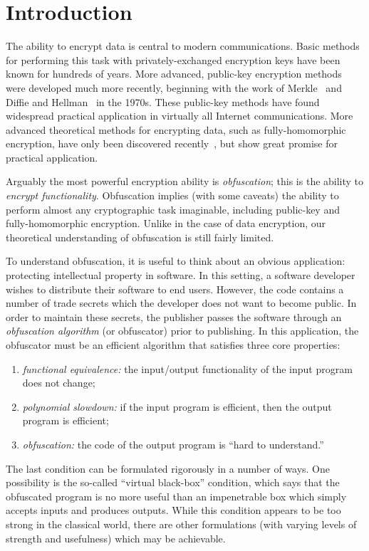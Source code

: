 \documentclass[envcountsame]{llncs}
\numberwithin{equation}{section}
\begin{document}
\section{Introduction}\label{sec:intro}

The ability to encrypt data is central to modern communications. Basic methods for performing this task with privately-exchanged encryption keys have been known for hundreds of years. More advanced, public-key encryption methods were developed much more recently, beginning with the work of Merkle~\cite{Merkle78} and Diffie and Hellman~\cite{DH76} in the 1970s. These public-key methods have found widespread practical application in virtually all Internet communications. More advanced theoretical methods for encrypting data, such as fully-homomorphic encryption, have only been discovered recently~\cite{Gentry09}, but show great promise for practical application.

Arguably the most powerful encryption ability is \emph{obfuscation}; this is the ability to \emph{encrypt functionality}. Obfuscation implies (with some caveats) the ability to perform almost any cryptographic task imaginable, including public-key and fully-homomorphic encryption. Unlike in the case of data encryption, our theoretical understanding of obfuscation is still fairly limited. 

To understand obfuscation, it is useful to think about an obvious application: protecting intellectual property in software. In this setting, a software developer wishes to distribute their software to end users. However, the code contains a number of trade secrets which the developer does not want to become public. In order to maintain these secrets, the publisher passes the software through an \emph{obfuscation algorithm} (or obfuscator) prior to publishing. In this application, the obfuscator must be an efficient algorithm that satisfies three core properties: 
\begin{enumerate}\label{def:obf-informal}
\item \emph{functional equivalence:} the input/output functionality of the input program does not change;
\item \emph{polynomial slowdown:} if the input program is efficient, then the output program is efficient;
\item \emph{obfuscation:} the code of the output program is ``hard to understand.''
\end{enumerate}
The last condition can be formulated rigorously in a number of ways. One possibility is the so-called ``virtual black-box'' condition, which says that the obfuscated program is no more useful than an impenetrable box which simply accepts inputs and produces outputs. While this condition appears to be too strong in the classical world, there are other formulations (with varying levels of strength and usefulness) which may be achievable.
\end{document}
